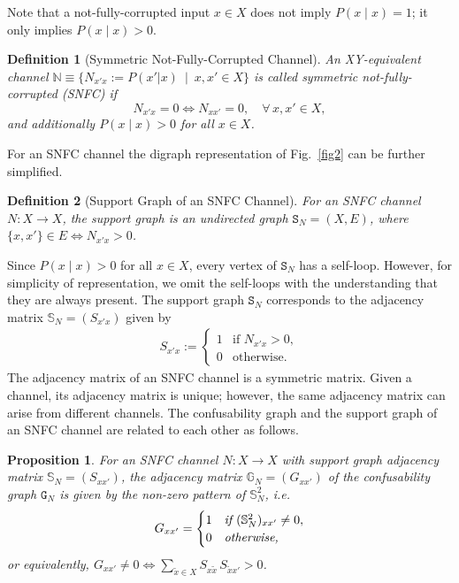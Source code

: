 \documentclass[12pt,a4paper]{article}
\newtheorem{proposition}{Proposition}
\newtheorem{definition}{Definition}
\begin{document}
\noindent Note that a not-fully-corrupted input $x \in X$ does not imply $P(x \mid x) = 1$; it only implies $P(x \mid x) > 0$. 

\begin{definition}[Symmetric Not-Fully-Corrupted Channel]\label{def:SNFC}
An XY-equivalent channel $\mathbb{N}\equiv\{N_{x'x}:=P(x'|x)~\mid~x,x'\in X\}$ is called symmetric not-fully-corrupted (SNFC) if 
\begin{equation*}
N_{x'x} = 0 \iff N_{xx'} = 0, \quad \forall\, x, x' \in X,
\end{equation*}
and additionally $P(x \mid x) > 0$ for all $x \in X$.
\end{definition}
   
\noindent For an SNFC channel the digraph representation of Fig.~\ref{fig2} can be further simplified.

\begin{definition}[Support Graph of an SNFC Channel]\label{def:support-graph-SNFC}
For an SNFC channel $N : X \to X$, the support graph is an undirected graph $\mathtt{S}_N = (X, E)$, where $\{x, x'\} \in E \iff N_{x'x} > 0$.
\end{definition}

\noindent Since $P(x \mid x) > 0$ for all $x \in X$, every vertex of $\mathtt{S}_N$ has a self-loop. However, for simplicity of representation, we omit the self-loops with the understanding that they are always present. The support graph $\mathtt{S}_N$ corresponds to the adjacency matrix $\mathbb{S}_N = (S_{x'x})$ given by
\begin{align}
S_{x'x} :=
\begin{cases}
1 & \text{if } N_{x'x} > 0, \\
0 & \text{otherwise}.
\end{cases}
\end{align}
\noindent The adjacency matrix of an SNFC channel is a symmetric matrix. Given a channel, its adjacency matrix is unique; however, the same adjacency matrix can arise from different channels. The confusability graph and the support graph of an SNFC channel are related to each other as follows.

\begin{proposition}\label{prop1}
For an SNFC channel $N : X \to X$ with support graph adjacency matrix $\mathbb{S}_N = (S_{xx'})$, the adjacency matrix $\mathbb{G}_N = (G_{xx'})$ of the confusability graph $\mathtt{G}_N$ is given by the non-zero pattern of $\mathbb{S}_N^2$, i.e.
\begin{equation}
G_{xx'} = 
\begin{cases}
1 & \emph{if } (\mathbb{S}_N^2)_{xx'} \neq 0, \\
0 & \emph{otherwise,}
\end{cases}
\end{equation}
or equivalently, $G_{xx'} \neq 0 \iff \sum_{\tilde{x} \in X} S_{x\tilde{x}}\, S_{\tilde{x}x'} > 0$.
\end{proposition}
\end{document}
